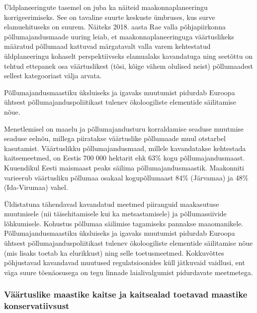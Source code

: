\documentclass[estonian,]{article}
\begin{document}
Üldplaneeringute tasemel on juba ka näiteid maakonnaplaneeringu korrigeerimiseks. See on tavaline suurte keskuste ümbruses, kus surve elamuehituseks on suurem. Näiteks 2018. aasta Rae valla põhjapiirkonna põllumajandusmaade uuring leiab, et maakonnaplaneeringuga väärtuslikeks määratud põllumaad kattuvad märgatavalt valla varem kehtestatud üldplaneeringu kohaselt perspektiivseks elamualaks kavandatuga ning seetõttu on tehtud ettepanek osa väärtuslikest (tõsi, kõige vähem olulised neist) põllumaadest sellest kategooriast välja arvata.

\begin{blockquote-left}
Põllumajandusmaastiku üksluiseks ja igavaks muutumist pidurdab Euroopa
ühtsest põllumajanduspoliitikast tulenev ökoloogiliste elementide
säilitamise nõue.
\end{blockquote-left}

Menetlemisel on maaelu ja põllumajandusturu korraldamise seaduse muutmise seaduse eelnõu, millega piiratakse väärtuslike põllumaade muul otstarbel kasutamist. Väärtuslikku põllumajandusmaad, millele kavandatakse kehtestada kaitsemeetmed, on Eestis 700 000 hektarit ehk 63\% kogu põllumajandusmaast. Kuuendikul Eesti maismaast peaks säilima põllumajandusmaastik. Maakonniti varieerub väärtusliku põllumaa osakaal kogupõllumaast 84\% (Järvamaa) ja 48\% (Ida-Virumaa) vahel.

Üldistatuna tähendavad kavandatud meetmed piiranguid maakasutuse muutmisele (nii täisehitamisele kui ka metsastamisele) ja põllumassiivide lõhkumisele. Kohustus põllumaa säilimise tagamiseks pannakse maaomanikele. Põllumajandusmaastiku üksluiseks ja igavaks muutumist pidurdab Euroopa ühtsest põllumajanduspoliitikast tulenev ökoloogiliste elementide säilitamise nõue (mis lisaks toetab ka elurikkust) ning selle toetusmeetmed. Kokkuvõttes põhjustavad kavandavad muutused regulatsioonides küll jätkuvaid vaidlusi, ent väga suure tõenäosusega on tegu linnade laialivalgumist pidurdavate meetmetega.

\hypertarget{vuxe4uxe4rtuslike-maastike-kaitse-ja-kaitsealad-toetavad-maastike-konservatiivsust}{%
\subsubsection*{Väärtuslike maastike kaitse ja kaitsealad toetavad maastike konservatiivsust}\label{vuxe4uxe4rtuslike-maastike-kaitse-ja-kaitsealad-toetavad-maastike-konservatiivsust}}
\end{document}
